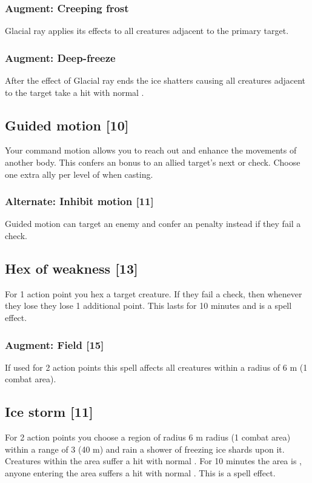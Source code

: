 \subsubsection{Augment: Creeping frost}
Glacial ray applies its effects to all creatures adjacent to the primary target.
\subsubsection{Augment: Deep-freeze}
After the effect of Glacial ray ends the ice shatters causing all creatures adjacent to the target take a hit with normal .


\subsection{Guided motion [10]}
Your command motion allows you to reach out and enhance the movements of another body. This confers an  bonus to an allied target's next  or  check. Choose one extra ally per level of  when casting.
\subsubsection{Alternate: Inhibit motion [11]}
Guided motion can target an enemy and confer an  penalty instead if they fail a  check.


\subsection{Hex of weakness [13]}
For 1 action point you hex a target creature. If they fail a  check, then whenever they lose  they lose 1 additional point. This lasts for 10 minutes and  is a  spell effect.
\subsubsection{Augment: Field [15]}
If used for 2 action points this spell affects all creatures within a radius of 6 m (1 combat area).


\subsection{Ice storm [11]}
For 2 action points you choose a region of radius 6 m radius (1 combat area) within a range of 3 (40 m) and rain a shower of freezing ice shards upon it. Creatures within the area suffer a hit with normal . For 10 minutes the area is , anyone entering the area suffers a hit with normal . This is a  spell effect.
